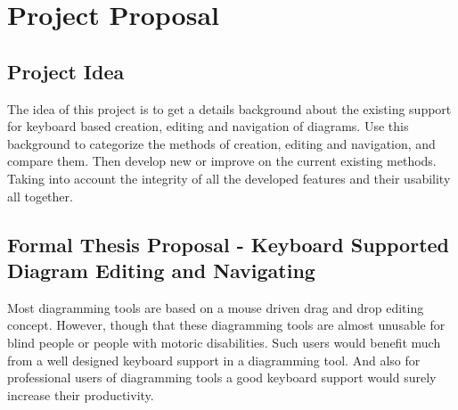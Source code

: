 \begin{comment}

\section{Problem Description}
Most diagramming tools base their interface on drag and drop actions performed by the user to place, move, or resize shapes. This causes problems for people who cannot handle pointing devices or don't have any.
\subsection{Software Problems}
The main problem is the lack of well designed software to support the blind, people with motoric disabilities, or simply someone that doesn't have his point device handy to create, edit and navigate diagrams efficiently.
The currently available software either supports diagram navigation, or diagram editing using the keyboard, but very rare software supports both to be working together. For example, in yEd [REFERENCE] there is very good support for diagram navigation using only the keyboard, while editing the node properties after finding the needed node is not supported to be done using the keyboard. Thus again requiring the using to use a pointing device.

\end{comment}

\section{Project Proposal}
\subsection{Project Idea}
The idea of this project is to get a details background about the existing support for keyboard based creation, editing and navigation of diagrams. Use this background to categorize the methods of creation, editing and navigation, and compare them. Then develop new or improve on the current existing methods. Taking into account the integrity of all the developed features and their usability all together.

\subsection{Formal Thesis Proposal - Keyboard Supported Diagram Editing and Navigating}
Most diagramming tools are based on a mouse driven drag and drop editing concept. However, though that these diagramming tools are almost unusable for blind people or people with motoric disabilities. Such users would benefit much from a well designed keyboard support in a diagramming tool. And also for professional users of diagramming tools a good keyboard support would surely increase their productivity.

